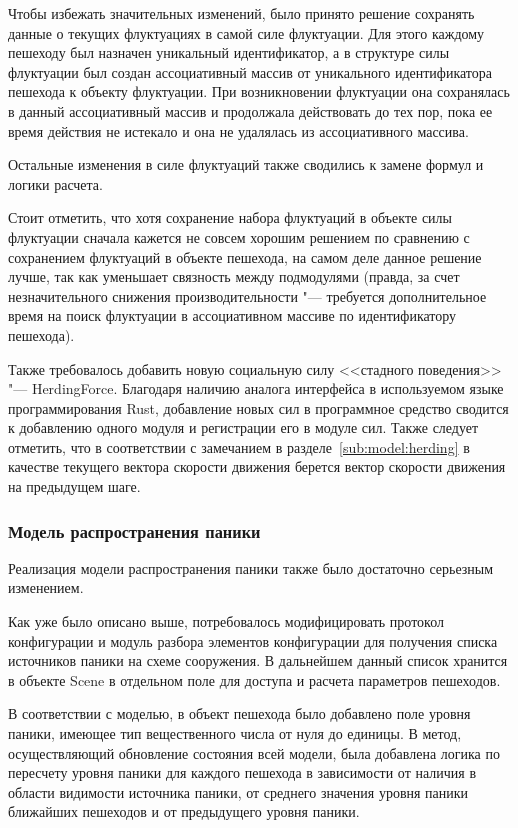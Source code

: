 Чтобы избежать значительных изменений, было принято решение сохранять данные о текущих флуктуациях в самой силе флуктуации.
Для этого каждому пешеходу был назначен уникальный идентификатор, а в структуре силы флуктуации был создан ассоциативный
массив от уникального идентификатора пешехода к объекту флуктуации.
При возникновении флуктуации она сохранялась в данный ассоциативный массив и продолжала действовать до тех пор, пока ее
время действия не истекало и она не удалялась из ассоциативного массива.

Остальные изменения в силе флуктуаций также сводились к замене формул и логики расчета.

Стоит отметить, что хотя сохранение набора флуктуаций в объекте силы флуктуации сначала кажется не совсем хорошим решением
по сравнению с сохранением флуктуаций в объекте пешехода, на самом деле данное решение лучше, так как уменьшает связность
между подмодулями (правда, за счет незначительного снижения производительности "--- требуется дополнительное время на поиск
флуктуации в ассоциативном массиве по идентификатору пешехода).

Также требовалось добавить новую социальную силу <<стадного поведения>> "--- Her\-ding\-For\-ce.
Благодаря наличию аналога интерфейса в используемом языке программирования Rust, добавление новых сил в программное средство
сводится к добавлению одного модуля и регистрации его в модуле сил. Также следует отметить, что в соответствии с замечанием в
разделе~\ref{sub:model:herding} в качестве текущего вектора скорости движения берется вектор скорости движения на предыдущем
шаге.

\subsubsection{Модель распространения паники}
\label{sec:development:core:panic_spread}

Реализация модели распространения паники также было достаточно серьезным изменением.

Как уже было описано выше, потребовалось модифицировать протокол конфигурации и модуль разбора элементов конфигурации для
получения списка источников паники на схеме сооружения.
В дальнейшем данный список хранится в объекте Sce\-ne в отдельном поле для доступа и расчета параметров пешеходов.

В соответствии с моделью, в объект пешехода было добавлено поле уровня паники, имеющее тип вещественного числа от нуля до единицы.
В метод, осуществляющий обновление состояния всей модели, была добавлена логика по пересчету уровня паники для каждого пешехода
в зависимости от наличия в области видимости источника паники, от среднего значения уровня паники ближайших пешеходов и от предыдущего уровня паники.

